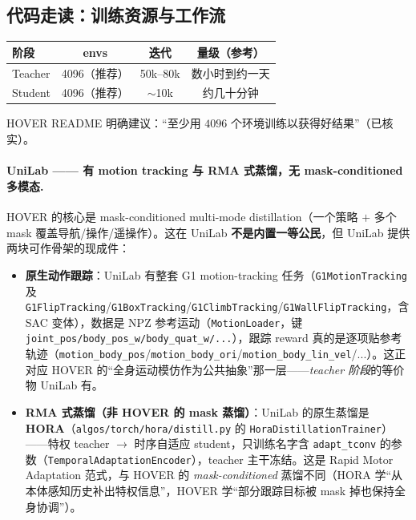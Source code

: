 \subsection{代码走读：训练资源与工作流}

\begin{center}
\small
\begin{tabular}{lccc}
\hline
阶段 & envs & 迭代 & 量级（参考） \\
\hline
Teacher & 4096（推荐） & 50k--80k & 数小时到约一天 \\
Student & 4096（推荐） & $\sim$10k & 约几十分钟 \\
\hline
\end{tabular}
\end{center}

HOVER README 明确建议：“至少用 $4096$ 个环境训练以获得好结果”（已核实）。

\paragraph{UniLab —— 有 motion tracking 与 RMA 式蒸馏，无 mask-conditioned 多模态.}
HOVER 的核心是 mask-conditioned multi-mode distillation（一个策略 $+$ 多个 mask 覆盖导航/操作/遥操作）。这在 UniLab \textbf{不是内置一等公民}，但 UniLab 提供两块可作骨架的现成件：

\begin{itemize}
  \item \textbf{原生动作跟踪}：UniLab 有整套 G1 motion-tracking 任务（\texttt{G1MotionTracking} 及 \texttt{G1FlipTracking}/\allowbreak\texttt{G1BoxTracking}/\allowbreak\texttt{G1ClimbTracking}/\allowbreak\texttt{G1WallFlipTracking}，含 SAC 变体），数据是 NPZ 参考运动（\texttt{MotionLoader}，键 \texttt{joint\_pos/\allowbreak body\_pos\_w/\allowbreak body\_quat\_w/\allowbreak ...}），跟踪 reward 真的是逐项贴参考轨迹（\texttt{motion\_body\_pos}/\allowbreak\texttt{motion\_body\_ori}/\allowbreak\texttt{motion\_body\_lin\_vel}/...）。这正对应 HOVER 的“全身运动模仿作为公共抽象”那一层——\emph{teacher 阶段}的等价物 UniLab 有。
  \item \textbf{RMA 式蒸馏（非 HOVER 的 mask 蒸馏）}：UniLab 的原生蒸馏是 \textbf{HORA}（\texttt{algos/\allowbreak torch/\allowbreak hora/\allowbreak distill.\allowbreak py} 的 \texttt{HoraDistillationTrainer}）——特权 teacher $\to$ 时序自适应 student，只训练名字含 \texttt{adapt\_tconv} 的参数（\texttt{TemporalAdaptationEncoder}），teacher 主干冻结。这是 Rapid Motor Adaptation 范式，与 HOVER 的 \emph{mask-conditioned} 蒸馏不同（HORA 学“从本体感知历史补出特权信息”，HOVER 学“部分跟踪目标被 mask 掉也保持全身协调”）。
\end{itemize}

